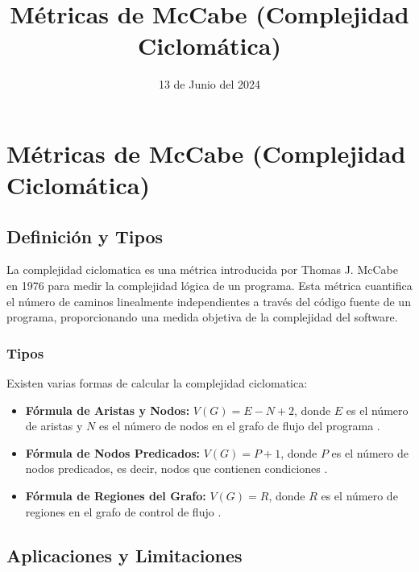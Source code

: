 \documentclass[10pt,authoryear,onecolumn]{article}
\title{Métricas de McCabe (Complejidad Ciclomática)}
\date{13 de Junio del 2024}
\begin{document}
\maketitle

\section{Métricas de McCabe (Complejidad Ciclomática)}

\subsection{Definición y Tipos}

La complejidad ciclomatica es una métrica introducida por Thomas J. McCabe en 1976 para medir la complejidad lógica de un programa. Esta métrica cuantifica el número de caminos linealmente independientes a través del código fuente de un programa, proporcionando una medida objetiva de la complejidad del software.

\subsubsection{Tipos}
Existen varias formas de calcular la complejidad ciclomatica:
\begin{itemize}
    \item \textbf{Fórmula de Aristas y Nodos:} \( V(G) = E - N + 2 \), donde \( E \) es el número de aristas y \( N \) es el número de nodos en el grafo de flujo del programa \parencite{scalabrino2019from}.
    \item \textbf{Fórmula de Nodos Predicados:} \( V(G) = P + 1 \), donde \( P \) es el número de nodos predicados, es decir, nodos que contienen condiciones \parencite{liu2018evaluate}.
    \item \textbf{Fórmula de Regiones del Grafo:} \( V(G) = R \), donde \( R \) es el número de regiones en el grafo de control de flujo \parencite{odeh2023measuring}.
\end{itemize}

\subsection{Aplicaciones y Limitaciones}
\end{document}
